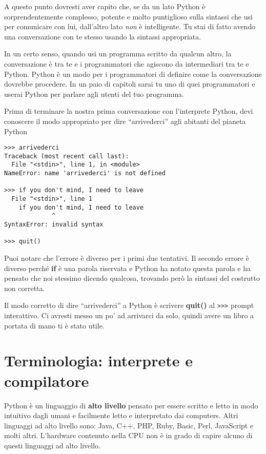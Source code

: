A questo punto dovresti aver capito che, se da un lato Python \`{e} sorprendentemente complesso, potente e molto puntiglioso sulla sintassi che usi per comunicare con lui, dall'altro lato \emph{non} \`{e} intelligente. Tu stai di fatto avendo una conversazione con te stesso usando la sintassi appropriata.

In un certo senso, quando usi un programma scritto da qualcun altro, la conversazione \`{e} tra te e i programmatori che agiscono da intermediari tra te e Python. Python \`{e} un modo per i programmatori di definire come la conversazione dovrebbe procedere. In un paio di capitoli sarai tu uno di quei programmatori e userai Python per parlare agli utenti del tuo programma.


Prima di terminare la nostra prima conversazione con l'interprete Python, devi conoscere il modo appropriato per dire {``}arrivederci'' agli abitanti del pianeta Python

\beforeverb
\begin{verbatim}
>>> arrivederci
Traceback (most recent call last):
  File "<stdin>", line 1, in <module>
NameError: name 'arrivederci' is not defined

>>> if you don't mind, I need to leave
  File "<stdin>", line 1
    if you don't mind, I need to leave
             ^
SyntaxError: invalid syntax

>>> quit()
\end{verbatim}
\afterverb
%
Puoi notare che l'errore \`{e} diverso per i primi due tentativi. Il secondo errore \`{e} diverso perch\'{e} \textbf{if} \`{e} una parola riservata e Python ha notato questa parola e ha pensato che noi stessimo dicendo qualcosa, trovando per\`{o} la sintassi del costrutto non corretta.

Il modo corretto di dire {``}arrivederci'' a Python \`{e} scrivere \textbf{quit()} al  {\tt >>>}  prompt interattivo. Ci avresti messo un po' ad arrivarci da solo, quindi avere un libro a portata di mano ti \`{e} stato utile.


\section{Terminologia: interprete e compilatore}

Python \`{e} un linguaggio di \textbf{alto livello} pensato per essere scritto e letto in modo intuitivo dagli umani e facilmente letto e interpretato dai computers. Altri linguaggi ad alto livello sono: Java, C++, PHP, Ruby, Basic, Perl, JavaScript e molti altri. L'hardware contenuto nella CPU non \`{e} in grado di capire alcuno di questi linguaggi ad alto livello.


